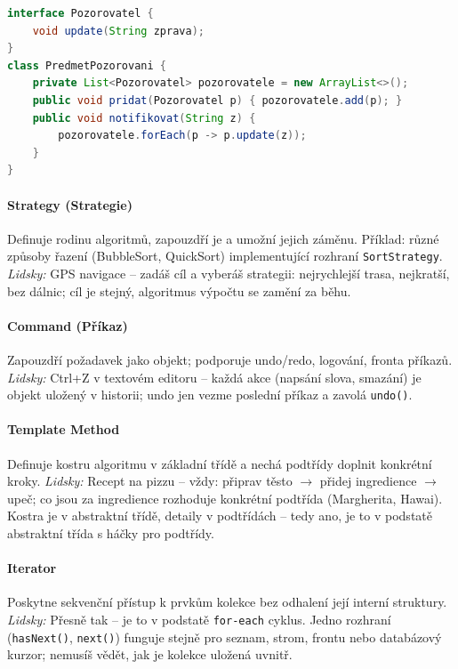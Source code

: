 \begin{lstlisting}[language=Java, caption=Observer]
interface Pozorovatel {
    void update(String zprava);
}
class PredmetPozorovani {
    private List<Pozorovatel> pozorovatele = new ArrayList<>();
    public void pridat(Pozorovatel p) { pozorovatele.add(p); }
    public void notifikovat(String z) {
        pozorovatele.forEach(p -> p.update(z));
    }
}
\end{lstlisting}

\paragraph{Strategy (Strategie)}
Definuje rodinu algoritmů, zapouzdří je a umožní jejich záměnu.
Příklad: různé způsoby řazení (BubbleSort, QuickSort) implementující rozhraní \texttt{SortStrategy}.
\textit{Lidsky:} GPS navigace -- zadáš cíl a vyberáš strategii: nejrychlejší trasa, nejkratší, bez dálnic; cíl je stejný, algoritmus výpočtu se zamění za běhu.

\paragraph{Command (Příkaz)}
Zapouzdří požadavek jako objekt; podporuje undo/redo, logování, fronta příkazů.
\textit{Lidsky:} Ctrl+Z v textovém editoru -- každá akce (napsání slova, smazání) je objekt uložený v historii; undo jen vezme poslední příkaz a zavolá \texttt{undo()}.

\paragraph{Template Method}
Definuje kostru algoritmu v základní třídě a nechá podtřídy doplnit konkrétní kroky.
\textit{Lidsky:} Recept na pizzu -- vždy: připrav těsto $\to$ přidej ingredience $\to$ upeč; co jsou za ingredience rozhoduje konkrétní podtřída (Margherita, Hawai). Kostra je v abstraktní třídě, detaily v podtřídách -- tedy ano, je to v podstatě abstraktní třída s háčky pro podtřídy.

\paragraph{Iterator}
Poskytne sekvenční přístup k prvkům kolekce bez odhalení její interní struktury.
\textit{Lidsky:} Přesně tak -- je to v podstatě \texttt{for-each} cyklus. Jedno rozhraní (\texttt{hasNext()}, \texttt{next()}) funguje stejně pro seznam, strom, frontu nebo databázový kurzor; nemusíš vědět, jak je kolekce uložená uvnitř.

